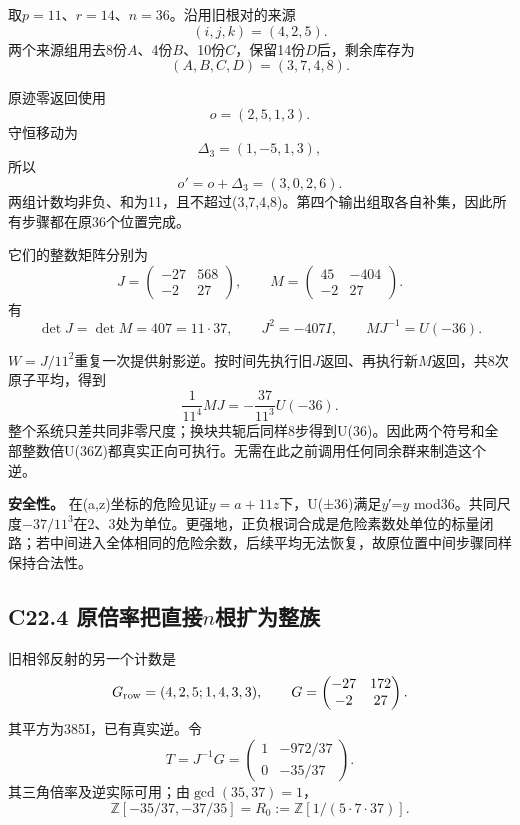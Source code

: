 {取\ensuremath{p=11}、\ensuremath{r=14}、\ensuremath{n=36}。沿用旧根对的来源} \[
(i,j,k)=(4,2,5).
\] {两个来源组用去8份\ensuremath{A}、4份\ensuremath{B}、10份\ensuremath{C}，保留14份\ensuremath{D}后，剩余库存为} \[
(A,B,C,D)=(3,7,4,8).
\]

{原迹零返回使用} \[
o=(2,5,1,3).
\] {守恒移动为} \[
\Delta_3=(1,-5,1,3),
\] {所以} \[
\boxed{o'=o+\Delta_3=(3,0,2,6).}
\] {两组计数均非负、和为11，且不超过(3,7,4,8)。第四个输出组取各自补集，因此所有步骤都在原36个位置完成。}

{它们的整数矩阵分别为} \[
J=\begin{pmatrix}-27&568\\-2&27\end{pmatrix},
\qquad
M=\begin{pmatrix}45&-404\\-2&27\end{pmatrix}.
\] {有} \[
\det J=\det M=407=11\cdot37,\qquad
J^2=-407I,\qquad
\boxed{MJ^{-1}=U(-36).}
\tag{C22.3.1}
\]

{\ensuremath{W=J/11^{2}}重复一次提供射影逆。按时间先执行旧\ensuremath{J}返回、再执行新\ensuremath{M}返回，共8次原子平均，得到} \[
\frac1{11^4}MJ
=-\frac{37}{11^3}U(-36).
\] {整个系统只差共同非零尺度；换块共轭后同样8步得到U(36)。因此两个符号和全部整数倍U(36Z)都真实正向可执行。无需在此之前调用任何同余群来制造这个逆。}

\textbf{{安全性。}} {在(a,z)坐标的危险见证\ensuremath{y=a+11z}下，U(±36)满足\ensuremath{y}′=\ensuremath{y}} {mod36。共同尺度−\ensuremath{37/11^{3}}在2、3处为单位。更强地，正负根词合成是危险素数处单位的标量闭路；若中间进入全体相同的危险余数，后续平均无法恢复，故原位置中间步骤同样保持合法性。}

\subsection*{\texorpdfstring{{C22.4} {原倍率把直接\ensuremath{n}根扩为整族}}{C22.4 原倍率把直接根扩为整族}}\label{C22-h149}

{旧相邻反射的另一个计数是} \[
G_{\rm row}=(4,2,5;1,4,3,3),\qquad
G=\begin{pmatrix}-27&172\\-2&27\end{pmatrix}.
\] {其平方为385I，已有真实逆。令} \[
T=J^{-1}G=
\begin{pmatrix}1&-972/37\\0&-35/37\end{pmatrix}.
\] {其三角倍率及逆实际可用；由\ensuremath{\operatorname{gcd}(35,37)=1}，} \[
\mathbb Z[-35/37,-37/35]=
R_0:=\mathbb Z[1/(5\cdot7\cdot37)].
\]


